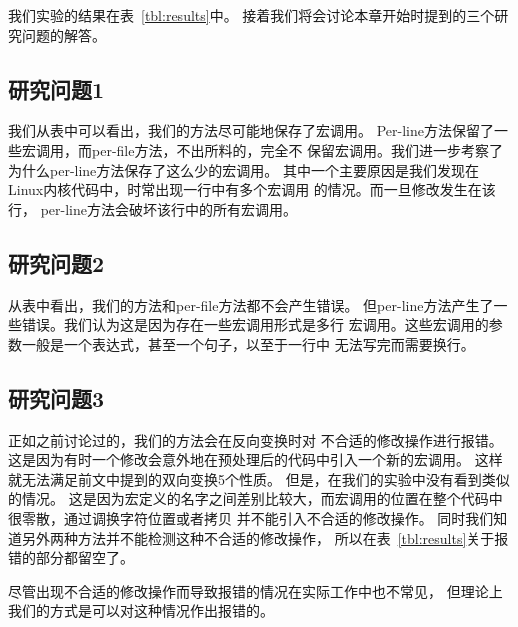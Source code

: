 
我们实验的结果在表~\ref{tbl:results}中。
接着我们将会讨论本章开始时提到的三个研究问题的解答。 

\subsection{研究问题1} 我们从表中可以看出，我们的方法尽可能地保存了宏调用。 
Per-line方法保留了一些宏调用，而per-file方法，不出所料的，完全不
保留宏调用。我们进一步考察了为什么per-line方法保存了这么少的宏调用。
其中一个主要原因是我们发现在Linux内核代码中，时常出现一行中有多个宏调用
的情况。而一旦修改发生在该行，
per-line方法会破坏该行中的所有宏调用。
\subsection{研究问题2} 从表中看出，我们的方法和per-file方法都不会产生错误。
但per-line方法产生了一些错误。我们认为这是因为存在一些宏调用形式是多行
宏调用。这些宏调用的参数一般是一个表达式，甚至一个句子，以至于一行中
无法写完而需要换行。
\subsection{研究问题3} 正如之前讨论过的，我们的方法会在反向变换时对
不合适的修改操作进行报错。这是因为有时一个修改会意外地在预处理后的代码中引入一个新的宏调用。
这样就无法满足前文中提到的双向变换5个性质。
但是，在我们的实验中没有看到类似的情况。
这是因为宏定义的名字之间差别比较大，而宏调用的位置在整个代码中很零散，通过调换字符位置或者拷贝
并不能引入不合适的修改操作。
同时我们知道另外两种方法并不能检测这种不合适的修改操作，
所以在表~\ref{tbl:results}关于报错的部分都留空了。

尽管出现不合适的修改操作而导致报错的情况在实际工作中也不常见，
但理论上我们的方式是可以对这种情况作出报错的。

